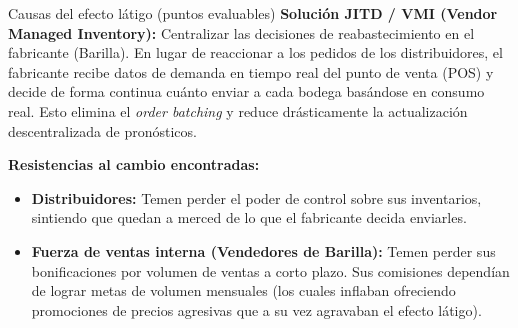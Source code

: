 \begin{definicion}{Causas del efecto látigo (puntos evaluables)}
\vspace{0.4em}
\textbf{Solución JITD / VMI (Vendor Managed Inventory):}
Centralizar las decisiones de reabastecimiento en el fabricante (Barilla). En lugar de reaccionar a los pedidos de los distribuidores, el fabricante recibe datos de demanda en tiempo real del punto de venta (POS) y decide de forma continua cuánto enviar a cada bodega basándose en consumo real. Esto elimina el \textit{order batching} y reduce drásticamente la actualización descentralizada de pronósticos.

\vspace{0.4em}
\textbf{Resistencias al cambio encontradas:}
\begin{itemize}[leftmargin=1.4em, itemsep=2pt]
  \item \textbf{Distribuidores:} Temen perder el poder de control sobre sus inventarios, sintiendo que quedan a merced de lo que el fabricante decida enviarles.
  \item \textbf{Fuerza de ventas interna (Vendedores de Barilla):} Temen perder sus bonificaciones por volumen de ventas a corto plazo. Sus comisiones dependían de lograr metas de volumen mensuales (los cuales inflaban ofreciendo promociones de precios agresivas que a su vez agravaban el efecto látigo).
\end{itemize}
\end{definicion}

